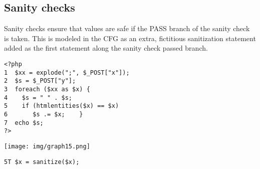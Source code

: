 \documentclass[a4paper, 10pt, titlepage]{article}
\begin{document}
\subsection{Sanity checks}
Sanity checks ensure that values are safe if the PASS branch of the sanity check is taken. This is modeled in the CFG as an extra, fictitious sanitization statement added as the first statement along the sanity check passed branch. \\
\begin{minipage}{0.5\textwidth}
\begin{small}
\begin{lstlisting}
<?php 
1  $xx = explode(";", $_POST["x"]); 
2  $s = $_POST["y"]; 
3  foreach ($xx as $x) { 
4    $s = " " . $s; 
5    if (htmlentities($x) == $x) 
6       $s .= $x;    } 
7  echo $s; 
?>
\end{lstlisting}
\end{small}
\end{minipage}
\hfill\vline\hfill
\begin{minipage}{0.4\textwidth}
\begin{center}
\texttt{[image: img/graph15.png]}
\end{center}
\begin{lstlisting}
5T $x = sanitize($x);
\end{lstlisting}
\end{minipage}
\end{document}
